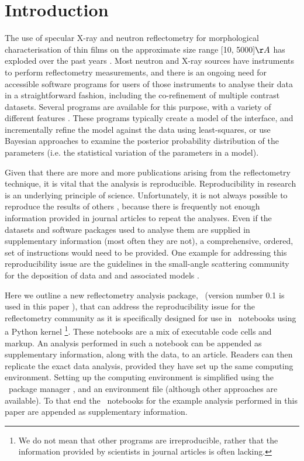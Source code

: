 \documentclass[12pt]{article}
\begin{document}
\section*{Introduction}
The use of specular X-ray and neutron reflectometry for morphological characterisation of thin films on the approximate size range [10, 5000]$\AA$ has exploded over the past years \cite{Wood2017, Daillant2009}. Most neutron and X-ray sources have instruments to perform reflectometry measurements, and there is an ongoing need for accessible software programs for users of those instruments to analyse their data in a straightforward fashion, including the co-refinement of multiple contrast datasets.  Several programs are available for this purpose, with a variety of different features \cite{Bjorck2007, Gerelli2016, Kienzle2011, Nelson2006}. These programs typically create a model of the interface, and incrementally refine the model against the data using least-squares, or use Bayesian approaches \cite{Sivia2006, 2010arXiv1008.4686H} to examine the posterior probability distribution of the parameters (i.e. the statistical variation of the parameters in a model).

Given that there are more and more publications arising from the reflectometry technique, it is vital that the analysis is reproducible. Reproducibility in research is an underlying principle of science. Unfortunately, it is not always possible to reproduce the results of others \cite{Stark2018}, because there is frequently not enough information provided in journal articles to repeat the analyses. Even if the datasets and software packages used to analyse them are supplied in supplementary information (most often they are not), a comprehensive, ordered, set of instructions would need to be provided.
One example for addressing this reproducibility issue are the guidelines in the small-angle scattering community for the deposition of data and and associated models \cite{Trewhella:jc5010}.

Here we outline a new reflectometry analysis package, \ (version number 0.1 is used in this paper \cite{refnx}), that can address the reproducibility issue for the reflectometry community as it is specifically designed for use in \Jupyter\ notebooks \cite{Kluyver:2016aa} using a Python kernel \footnote{We do not mean that other programs are irreproducible, rather that the information provided by scientists in journal articles is often lacking.}.
These notebooks are a mix of executable code cells and markup. An analysis performed in such a notebook can be appended as supplementary information, along with the data, to an article. Readers can then replicate the exact data analysis, provided they have set up the same computing environment. Setting up the computing environment is simplified using the \conda\ package manager \cite{conda}, and an environment file (although other approaches are available). To that end the \Jupyter\ notebooks for the example analysis performed in this paper are appended as supplementary information.
\end{document}
